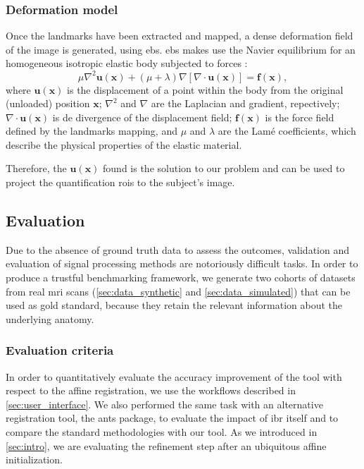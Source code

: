\documentclass{frontiers}
\newcommand{\vect}[1]{\ensuremath{\mathbf{#1}}}
\begin{document}
\subsubsection{Deformation model}
\label{sec:deformation}
Once the landmarks have been extracted and mapped, a dense deformation field of the image
  is generated, using \gls*{ebs}. \gls*{ebs} makes use the Navier 
  equilibrium  for an homogeneous isotropic elastic body
  subjected to forces \citep{davis_physics-based_1997}:
  \begin{equation}
    \label{eq:ebs_pde}
    \mu \nabla^2 \vect{u}(\vect{x}) + (\mu+\lambda) \nabla \left[ \nabla \cdot \vect{u}(\vect{x}) \right] = \vect{f}(\vect{x}),
  \end{equation}
  where $\vect{u}(\vect{x})$ is the displacement of a point within the body
  from the original (unloaded) position $\vect{x}$; $\nabla^2$ and $\nabla$
  are the Laplacian and gradient, repectively; $\nabla \cdot \vect{u}(\vect{x})$
  is de divergence of the displacement field; $\vect{f}(\vect{x})$ is the force
  field defined by the landmarks mapping, and $\mu$ and $\lambda$ are the Lam\'e
  coefficients, which describe the physical properties of the elastic material.

Therefore, the $\vect{u}(\vect{x})$ found is the solution to our problem and
  can be used to project the quantification \glspl*{roi} to the subject's image.


\subsection{Evaluation}
\label{sec:evaluation}

Due to the absence of ground truth data to assess the outcomes, validation and evaluation 
  of signal processing methods are notoriously difficult tasks.
In order to produce a trustful benchmarking framework, we generate two cohorts
  of datasets from real \gls*{mri} scans (\autoref{sec:data_synthetic}
  and \autoref{sec:data_simulated}) that can be used as gold standard, 
  because they retain the relevant information about the underlying anatomy.

\subsubsection{Evaluation criteria} %
In order to quantitatively evaluate the accuracy improvement of
  the tool with respect to the affine registration, we use the 
  workflows described in \autoref{sec:user_interface}.
We also performed the same task with an alternative registration
  tool, the \gls*{ants} package, to evaluate the impact of
  \gls*{ibr} itself and to compare the
  standard methodologies with our tool.
As we introduced in \autoref{sec:intro}, we are evaluating the
  refinement step after an ubiquitous affine initialization.
  
\end{document}

